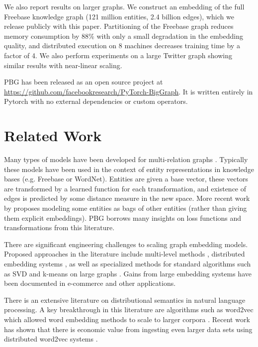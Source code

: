 \documentclass{article}
\begin{document}
We also report results on larger graphs. We construct an embedding of the full Freebase knowledge graph (121 million entities, 2.4 billion edges), which we release publicly with this paper. Partitioning of the Freebase graph reduces memory consumption by 88\% with only a small degradation in the embedding quality,  and distributed execution on 8 machines decreases training time by a factor of 4. We also perform experiments on a large Twitter graph showing similar results with near-linear scaling.

PBG has been released as an open source project at \url{https://github.com/facebookresearch/PyTorch-BigGraph}. It is written entirely in Pytorch \cite{paszke2017automatic} with no external dependencies or custom operators.

\section{Related Work}
Many types of models have been developed for multi-relation graphs \cite{bordes2011learning,transE,nickel2011three,trouillon2016complex}. Typically these models  have been used in the context of entity representations in knowledge bases (e.g. Freebase or WordNet). Entities are given a base vector, these vectors are transformed by a learned function for each transformation, and existence of edges is predicted by some distance measure in the new space. More recent work by \citeauthor{wu2017starspace} proposes modeling some entities as bags of other entities (rather than giving them explicit embeddings). PBG borrows many insights on loss functions and transformations from this literature.

There are significant engineering challenges to scaling graph embedding models. Proposed approaches in the literature include multi-level methods \cite{liang2018mile}, distributed embedding systems \cite{gridword2vec, Swivel2016}, as well as specialized methods for standard algorithms such as SVD and k-means on large graphs \cite{ching2015one}. Gains from large embedding systems have been documented in e-commerce \cite{wang2018billion} and other applications. 

There is an extensive literature on distributional semantics in natural language processing. A key breakthrough in this literature are algorithms such as word2vec which allowed word embedding methods to scale to larger corpora \cite{mikolov2013efficient}. Recent work has shown that there is economic value from ingesting even larger data sets using distributed word2vec systems \cite{gridword2vec}. 
\end{document}
